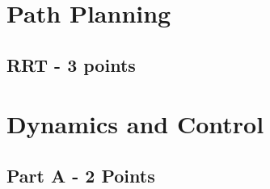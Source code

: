 \documentclass{article}
\numberwithin{equation}{section} %
\numberwithin{figure}{section} %
\numberwithin{table}{section} %
\begin{document}
\section{Path Planning}

\begin{framed}
\subsection{ RRT - 3 points}
\label{sec:RRT}
\end{framed}

\section{Dynamics and Control}

\begin{framed}
\subsection{ Part A - 2 Points}
\label{sec:DynAndCtrl}
\end{framed}
\end{document}
